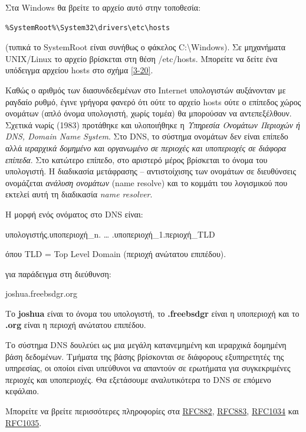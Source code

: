Στα Windows θα βρείτε το αρχείο αυτό στην τοποθεσία:

\begin{verbatim}
%SystemRoot%\System32\drivers\etc\hosts
\end{verbatim}

(τυπικά το SystemRoot είναι συνήθως ο φάκελος C:\textbackslash{}Windows). Σε μηχανήματα UNIX/Linux το αρχείο βρίσκεται στη θέση /etc/hosts. Μπορείτε να δείτε ένα υπόδειγμα αρχείου hosts στο σχήμα \ref{3-20}.

Καθώς ο αριθμός των διασυνδεδεμένων στο Internet υπολογιστών αυξάνονταν με ραγδαίο ρυθμό, έγινε γρήγορα φανερό ότι ούτε το αρχείο hosts ούτε ο επίπεδος χώρος ονομάτων (απλό όνομα υπολογιστή, χωρίς τομέα) θα μπορούσαν να αντεπεξέλθουν. Σχετικά νωρίς (1983) προτάθηκε και υλοποιήθηκε η \emph{Υπηρεσία Ονομάτων Περιοχών ή DNS, Domain Name System}. Στο DNS, το σύστημα ονομάτων δεν είναι επίπεδο αλλά \emph{ιεραρχικά δομημένο και οργανωμένο σε περιοχές και υποπεριοχές σε διάφορα επίπεδα}. Στο κατώτερο επίπεδο, στο αριστερό μέρος βρίσκεται το όνομα του υπολογιστή. Η διαδικασία μετάφρασης -- αντιστοίχισης των ονομάτων σε διευθύνσεις ονομάζεται \emph{ανάλυση ονομάτων} (name resolve) και το κομμάτι του λογισμικού που εκτελεί αυτή τη διαδικασία \emph{name resolver}.

Η μορφή ενός ονόματος στο DNS είναι:

\begin{centering}
υπολογιστής.υποπεριοχή\_n. \ldots{} .υποπεριοχή\_1.περιοχή\_TLD
\end{centering}

όπου TLD = Top Level Domain (περιοχή ανώτατου επιπέδου).

για παράδειγμα στη διεύθυνση:

\begin{centering}
joshua.freebsdgr.org
\end{centering}

Το \textbf{joshua} είναι το όνομα του υπολογιστή, το \textbf{.freebsdgr} είναι η υποπεριοχή και το \textbf{.org} είναι η περιοχή ανώτατου επιπέδου.

Το σύστημα DNS δουλεύει ως μια μεγάλη κατανεμημένη και ιεραρχικά δομημένη βάση δεδομένων. Τμήματα της βάσης βρίσκονται σε διάφορους εξυπηρετητές της υπηρεσίας, οι οποίοι είναι υπεύθυνοι να απαντούν σε ερωτήματα για συγκεκριμένες περιοχές και υποπεριοχές. Θα εξετάσουμε αναλυτικότερα το DNS σε επόμενο κεφάλαιο. 

Μπορείτε να βρείτε περισσότερες πληροφορίες στα \href{https://www.ietf.org/rfc/rfc882.txt}{RFC882}, \href{https://www.ietf.org/rfc/rfc883.txt}{RFC883}, \href{https://www.ietf.org/rfc/rfc1034.txt}{RFC1034} και \href{https://www.ietf.org/rfc/rfc1035.txt}{RFC1035}.